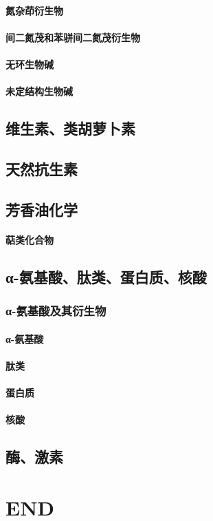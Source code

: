 \documentclass[UTF8]{../03-Chemistry}
\begin{document}
    \subsubsection{氮杂茚衍生物}
    \subsubsection{间二氮茂和苯骈间二氮茂衍生物}
    \subsubsection{无环生物碱}
    \subsubsection{未定结构生物碱}
\section{维生素、类胡萝卜素}
\section{天然抗生素}
\section{芳香油化学}
    \subsubsection{萜类化合物}
\section{α-氨基酸、肽类、蛋白质、核酸}
    \subsection{α-氨基酸及其衍生物}
        \subsubsection{α-氨基酸}
    \subsubsection{肽类}
    \subsubsection{蛋白质}
    \subsubsection{核酸}
\section{酶、激素}



\chapter{END}
\end{document}
